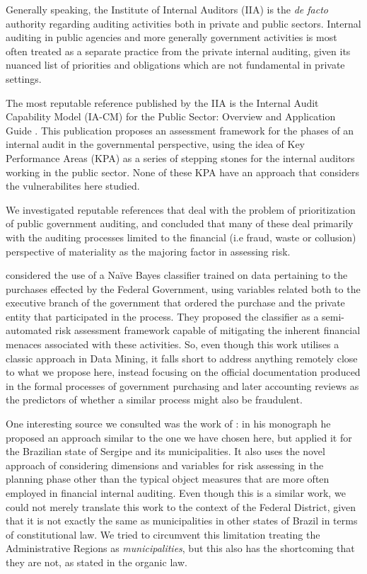 \documentclass[conference]{IEEEtran}
\begin{document}
Generally speaking, the Institute of Internal Auditors (IIA) is the \textit{de facto} authority regarding auditing activities both in private and public sectors. Internal auditing in public agencies and more generally government activities is most often treated as a separate practice from the private internal auditing, given its nuanced list of priorities and obligations which are not fundamental in private settings. 

The most reputable reference published by the IIA is the Internal Audit Capability Model (IA-CM) for the Public Sector: Overview and Application Guide \cite{institute_of_internal_auditors_internal_2009}. This publication proposes an assessment framework for the phases of an internal audit in the governmental perspective, using the idea of Key Performance Areas (KPA) as a series of stepping stones for the internal auditors working in the public sector. None of these KPA have an approach that considers the vulnerabilites here studied.

We investigated reputable references that deal with the problem of prioritization of public government auditing, and concluded that many of these deal primarily with the auditing processes limited to the financial (i.e fraud, waste or collusion) perspective of materiality as the majoring factor in assessing risk. 

\textcite{balaniuk2012risk} considered the use of a Naïve Bayes classifier trained on data pertaining to the purchases effected by the Federal Government, using variables related both to the executive branch of the government that ordered the purchase and the private entity that participated in the process. They proposed the classifier as a semi-automated risk assessment framework capable of mitigating the inherent financial menaces associated with these activities. So, even though this work utilises a classic approach in Data Mining, it falls short to address anything remotely close to what we propose here, instead focusing on the official documentation produced in the formal processes of government purchasing and later accounting reviews as the predictors of whether a similar process might also be fraudulent.

One interesting source we consulted was the work of \textcite{nascimento_indice_2022}: in his monograph he proposed an approach similar to the one we have chosen here, but applied it for the Brazilian state of Sergipe and its municipalities. It also uses the novel approach of considering dimensions and variables for risk assessing in the planning phase other than the typical object measures that are more often employed in financial internal auditing. Even though this is a similar work, we could not merely translate this work to the context of the Federal District, given that it is not exactly the same as municipalities in other states of Brazil in terms of constitutional law. We tried to circumvent this limitation treating the Administrative Regions as \textit{municipalities}, but this also has the shortcoming that they are not, as stated in the organic law.
\end{document}
